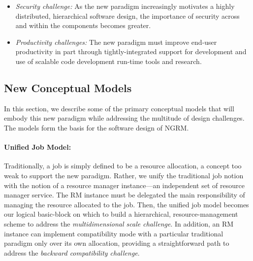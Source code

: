\documentclass{article}
\newcommand{\ngrm}{NGRM}
\begin{document}
\begin{itemize}
\item{\sl Security challenge:} As the new paradigm increasingly motivates
     a highly distributed, hierarchical software design, 
     the importance of security across and within the components becomes greater.

\item{\sl Productivity challenges:} The new paradigm must improve end-user 
     productivity in part through tightly-integrated support for development
     and use of scalable code development run-time tools and research.

\end{itemize}


\subsection{New Conceptual Models}
In this section, we describe some of the primary conceptual models that will embody 
this new paradigm while addressing the multitude of design challenges. 
The models form the basis for the software design of \ngrm.

\paragraph{Unified Job Model:}
Traditionally, a job is simply defined to be a resource allocation, 
a concept too weak to support the new paradigm. 
Rather, we unify the traditional job notion 
with the notion of a resource manager instance---an independent set of resource manager service.
The RM instance must be delegated the main responsibility of managing the resource allocated to the job.
Then, the unified job model becomes our logical basic-block
on which to build a hierarchical, resource-management 
scheme to address the {\sl multidimensional scale challenge}.
In addition, an RM instance can implement compatibility mode with a particular 
traditional paradigm only over its own allocation, providing a straightforward path to address
the {\sl backward compatibility challenge}. 
\end{document}
